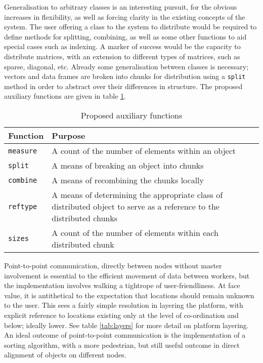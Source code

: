 \documentclass[10pt, a4paper]{article}
\begin{document}
Generalisation to arbitrary classes is an interesting pursuit, for the obvious
increases in flexibility, as well as forcing clarity in the existing concepts
of the system.
The user offering a class to the system to distribute would be required to
define methods for splitting, combining, as well as some other functions to aid
special cases such as indexing.
A marker of success would be the capacity to distribute matrices, with an
extension to different types of matrices, such as sparse, diagonal, etc.
Already some generalisation between classes is necessary;
vectors and data frames are broken into chunks for distribution using a
\texttt{split} method in order to abstract over their differences in structure.
The proposed auxiliary functions are given in table \ref{tab:aux}.

\begin{table}
	\centering
	\begin{tabularx}{\textwidth}{ l X }
		\toprule
		Function		& Purpose \\
		\midrule
		\texttt{measure} 	& A count of the number of elements 
					  within an object\\
		\texttt{split} 		& A means of breaking an object into
					  chunks\\
		\texttt{combine} 	& A means of recombining the chunks
					  locally\\
		\texttt{reftype} 	& A means of determining the 
					  appropriate class of distributed 
					  object to serve as a reference to the
					  distributed chunks \\
		\texttt{sizes} 		& A count of the number of elements 
					  within each distributed chunk\\
	\end{tabularx}
	\caption{Proposed auxiliary functions}
	\label{tab:aux}
\end{table}
			

Point-to-point communication, directly between nodes without master involvement
is essential to the efficient movement of data between workers, but the
implementation involves walking a tightrope of user-friendliness.
At face value, it is antithetical to the expectation that locations should
remain unknown to the user. 
This sees a fairly simple resolution in layering the platform, with explicit
reference to locations existing only at the level of co-ordination and below;
ideally lower.
See table \ref{tab:layers} for more detail on platform layering.
An ideal outcome of point-to-point communication is the implementation of a
sorting algorithm, with a more pedestrian, but still useful outcome in direct
alignment of objects on different nodes.
\end{document}
